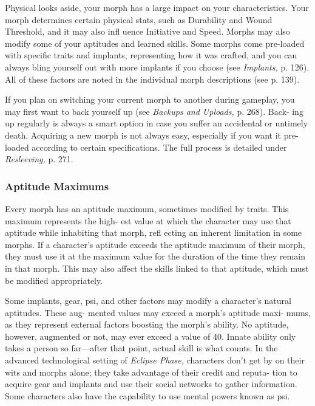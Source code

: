 Physical looks aside, your morph has a large impact 
on your characteristics. Your morph determines certain 
physical stats, such as Durability and Wound Threshold, 
and it may also infl uence Initiative and Speed. Morphs 
may also modify some of your aptitudes and learned 
skills. Some morphs come pre-loaded with specific traits 
and implants, representing how it was crafted, and you 
can always bling yourself out with more implants if 
you choose (see \textit{Implants,} p. 126). All of these factors 
are noted in the individual morph descriptions (see 
p. 139).

If you plan on switching your current morph to 
another during gameplay, you may first want to back 
yourself up (see \textit{Backups and Uploads,} p. 268). Back-
ing up regularly is always a smart option in case you 
suffer an accidental or untimely death. Acquiring a 
new morph is not always easy, especially if you want 
it pre-loaded according to certain specifications. The 
full process is detailed under \textit{Resleeving,} p. 271.

\subsubsection{Aptitude Maximums}

Every morph has an aptitude maximum, sometimes 
modified by traits. This maximum represents the high-
est value at which the character may use that aptitude 
while inhabiting that morph, refl ecting an inherent 
limitation in some morphs. If a character's aptitude 
exceeds the aptitude maximum of their morph, they 
must use it at the maximum value for the duration 
of the time they remain in that morph. This may also 
affect the skills linked to that aptitude, which must be 
modified appropriately.

Some implants, gear, psi, and other factors may 
modify a character's natural aptitudes. These aug-
mented values may exceed a morph's aptitude maxi-
mums, as they represent external factors boosting the 
morph's ability. No aptitude, however, augmented or 
not, may ever exceed a value of 40. Innate ability only 
takes a person so far—after that point, actual skill is 
what counts.
In the advanced technological setting of \textit{Eclipse Phase,} 
characters don't get by on their wits and morphs 
alone; they take advantage of their credit and reputa-
tion to acquire gear and implants and use their social 
networks to gather information. Some characters also 
have the capability to use mental powers known as psi.

